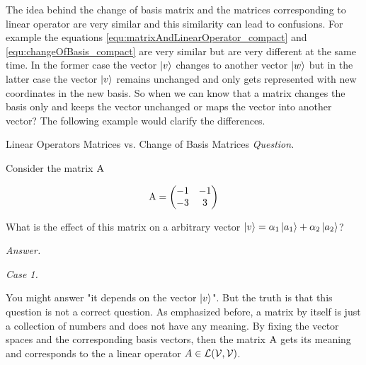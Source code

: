 The idea behind the change of basis matrix and the matrices corresponding to linear operator are very similar and this similarity can lead to confusions. For example the equations \ref{equ:matrixAndLinearOperator_compact} and \ref{equ:changeOfBasis_compact} are very similar but are very different at the same time. In the former case the vector $ \ket{v} $ changes to another vector $ \ket{w} $ but in the latter case the vector $\ket{v} $ remains unchanged and only gets represented with new coordinates in the new basis. So when we can know that a matrix changes the basis only and keeps the vector unchanged or maps the vector into another vector? The following example would clarify the differences.

\begin{example}{Linear Operators Matrices vs. Change of Basis Matrices}
	\emph{Question.}
	
	Consider the matrix $ \operatorname{A} $
	
	\[ \operatorname{A} = \begin{pmatrix}
		-1	&	-1	\\
		-3	&	3	
	\end{pmatrix} \]

	What is the effect of this matrix on a arbitrary vector $\ket{v} = \alpha_1 \ket{a_1} + \alpha_2 \ket{a_2}$? \newline
	
	\emph{Answer.}
	
	\emph{Case 1.}
	
	You might answer "it depends on the vector $ \ket{v} $". But the truth is that this question is not a correct question. As emphasized before, a matrix by itself is just a collection of numbers and does not have any meaning. By fixing the vector spaces and the corresponding basis vectors, then the matrix $ \operatorname{A} $ gets its meaning and corresponds to the a linear operator $ A \in \mathcal{L}(\mathcal{V},\mathcal{V}) $. 
	

\end{example}
